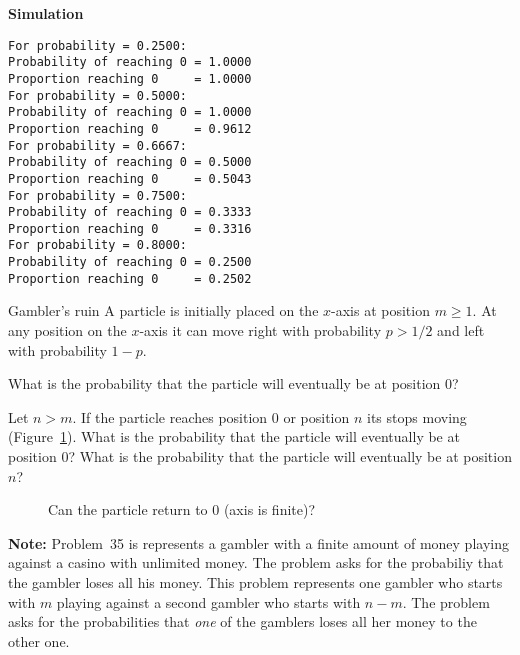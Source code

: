 \textbf{Simulation}
\begin{verbatim}
For probability = 0.2500:
Probability of reaching 0 = 1.0000
Proportion reaching 0     = 1.0000
For probability = 0.5000:
Probability of reaching 0 = 1.0000
Proportion reaching 0     = 0.9612
For probability = 0.6667:
Probability of reaching 0 = 0.5000
Proportion reaching 0     = 0.5043
For probability = 0.7500:
Probability of reaching 0 = 0.3333
Proportion reaching 0     = 0.3316
For probability = 0.8000:
Probability of reaching 0 = 0.2500
Proportion reaching 0     = 0.2502
\end{verbatim}


\begin{prob}{Gambler's ruin}
A particle is initially placed on the $x$-axis at position $m\geq 1$. At any position on the $x$-axis it can move right with probability $p>1/2$ and left with probability $1-p$.

 What is the probability that the particle will eventually be at position $0$?

 Let $n>m$. If the particle reaches position $0$ or position $n$ its stops moving (Figure~\ref{f.ruin3}). What is the probability that the particle will eventually be at position $0$? What is the probability that the particle will eventually be at position $n$?
\begin{figure}[tb]
\begin{center}
\end{center}
\caption{Can the particle return to $0$ (axis is finite)?}\label{f.ruin3}
\end{figure}

\textbf{Note:} Problem~35 is represents a gambler with a finite amount of money playing against a casino with unlimited money. The problem asks for the probabiliy that the gambler loses all his money. This problem represents one gambler who starts with $m$ playing against a second gambler who starts with $n-m$. The problem asks for the probabilities that \emph{one} of the gamblers loses all her money to the other one.
\end{prob}

